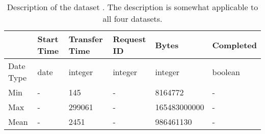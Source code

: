 \begin{table}[htp!]
    \centering
    \caption{Description of the dataset . The
    description is somewhat applicable to all four datasets.}
    \label{table:data}
    \begin{tabular}{l|lllll}
        & Start  Time & Transfer Time & Request ID & Bytes & Completed\\ \hline
        Date Type & date & integer  & integer & integer & boolean\\
        Min & - & 145 & - & 8164772 &  -\\
        Max & - & 299061 & - & 165483000000 &  -\\
        Mean & - & 2451 & - & 986461130 &  -\\
    \end{tabular}
\end{table}
